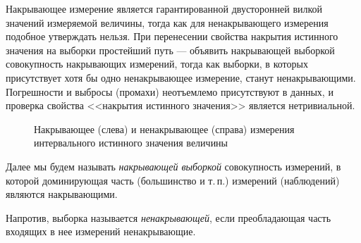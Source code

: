 \documentclass[a5paper,openany]{book}
\begin{document}

Накрывающее измерение является гарантированной двусторонней вилкой значений 
измеряемой величины, тогда как для ненакрывающего измерения  подобное утверждать 
нельзя. При перенесении свойства накрытия истинного значения на выборки простейший путь --- объявить накрывающей выборкой совокупность накрывающих измерений, тогда как выборки, в которых присутствует хотя бы одно ненакрывающее измерение, станут ненакрывающими. 
Погрешности и выбросы (промахи) неотъемлемо присутствуют в данных, и проверка свойства <<накрытия истинного значения>> является нетривиальной. 


\begin{figure}[!ht]
\unitlength=1mm
\centering\small 
{}
\caption{Накрывающее (слева) и ненакрывающее (справа)  	измерения
	интервального истинного значения величины }
\label{ICoverMeasurPic} 
\end{figure} 
Далее мы будем называть \textit{накрывающей выборкой} 
совокупность измерений, в которой доминирующая часть (большинство и т.\,п.) 
измерений (наблюдений) являются накрывающими.  

Напротив, выборка называется \textsl{ненакрывающей}, если преобладающая часть входящих в нее измерений ненакрывающие. 
\end{document}
